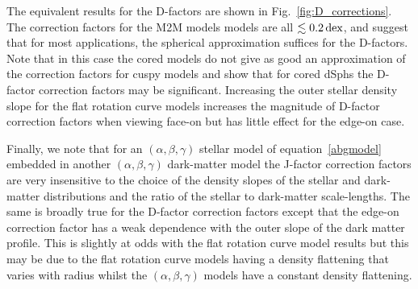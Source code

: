 \documentclass[prd,twocolumn,showpacs,preprintnumbers,superscriptaddress,nofootinbib,amsmath,amssymb,nobalancelastpage]{revtex4}
\def\dex{\,{\rm dex}}
\begin{document}
The equivalent results for the D-factors are shown in
Fig.~\ref{fig:D_corrections}. The correction factors for the M2M models
models are all $\lesssim0.2\dex$, and suggest that for most applications, the spherical
approximation suffices for the D-factors. Note that in this case the cored models do not give as good an approximation of the correction factors for cuspy models and show that for cored dSphs the D-factor correction factors may be significant. Increasing the outer stellar density slope for the flat rotation curve models increases the magnitude of D-factor correction factors when viewing face-on but has little effect for the edge-on case.

Finally, we note that for an $(\alpha,\beta,\gamma)$ stellar model of equation~\eqref{abgmodel} embedded in another $(\alpha,\beta,\gamma)$ dark-matter model the J-factor correction factors are very insensitive to the choice of the density slopes of the stellar and dark-matter distributions and the ratio of the stellar to dark-matter scale-lengths. The same is broadly true for the D-factor correction factors except that the edge-on correction factor has a weak dependence with the outer slope of the dark matter profile. This is slightly at odds with the flat rotation curve model results but this may be due to the flat rotation curve models having a density flattening that varies with radius whilst the $(\alpha,\beta,\gamma)$ models have a constant density flattening.
\end{document}
